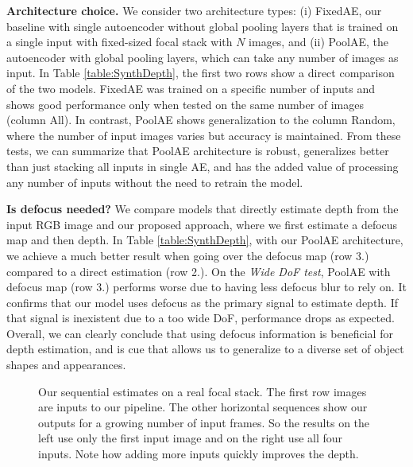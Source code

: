 \documentclass[10pt,twocolumn,letterpaper]{article}
\begin{document}
\noindent\textbf{Architecture choice.} We consider two architecture types: (i) FixedAE, our baseline with single autoencoder without global pooling layers that is trained on a single input with fixed-sized focal stack with $N$ images, and (ii) PoolAE, the autoencoder with global pooling layers, which can take any number of images as input. 
In Table \ref{table:SynthDepth}, the first two rows show a direct comparison of the two models. 
FixedAE was trained on a specific number of inputs and shows good performance only when tested on the same number of images (column All).
In contrast, PoolAE shows generalization to the column Random, where the number of input images varies but accuracy is maintained.
From these tests, we can summarize that PoolAE architecture is robust, generalizes better than just stacking all inputs in single AE, and has the added value of processing any number of inputs without the need to retrain the model.




\noindent\textbf{Is defocus needed?} We compare models that directly estimate depth from the input RGB image and our proposed approach, where we first estimate a defocus map and then depth.
In Table \ref{table:SynthDepth}, with our PoolAE architecture, we achieve a much better result when going over the defocus map (row 3.) compared to a direct estimation (row 2.). 
On the {\it Wide DoF test}, PoolAE with defocus map (row 3.) performs worse due to having less defocus blur to rely on. It confirms that our model uses defocus as the primary signal to estimate depth. If that signal is inexistent due to a too wide DoF, performance drops as expected.
Overall, we can clearly conclude that using defocus information is beneficial for depth estimation, and is cue that allows us to generalize to a diverse set of object shapes and appearances.


\begin{figure}
\begin{center}
\end{center}
\vspace{-0.3cm}
   \caption{Our sequential estimates on a real focal stack. The first row images are inputs to our pipeline. The other horizontal sequences show our outputs for a growing number of input frames. So the results on the left use only the first input image and on the right use all four inputs. Note how adding more inputs quickly improves the depth.
   }
\label{fig:SynthDefocus}
\end{figure}
\end{document}
